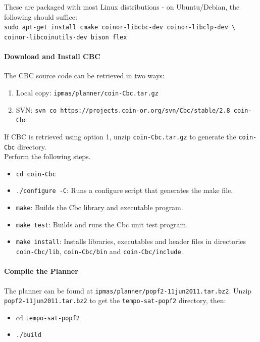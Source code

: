 These are packaged with most Linux distributions - on Ubuntu/Debian, the following should suffice:\\

\texttt{sudo apt-get install cmake coinor-libcbc-dev coinor-libclp-dev \textbackslash \\coinor-libcoinutils-dev bison flex}

\paragraph{Download and Install CBC}
The CBC source code can be retrieved in two ways:

\begin{enumerate}
\item Local copy: \texttt{ipmas/planner/coin-Cbc.tar.gz}
\item SVN: \footnotesize{\texttt{svn co https://projects.coin-or.org/svn/Cbc/stable/2.8 coin-Cbc}}
\end{enumerate}

If CBC is retrieved using option 1, unzip \texttt{coin-Cbc.tar.gz} to generate the \texttt{coin-Cbc} directory.\\ 

Perform the following steps.
\begin{itemize}
\item \texttt{cd coin-Cbc}
\item \texttt{./configure -C}: Runs a configure script that generates the make file.
\item \texttt{make}: Builds the Cbc library and executable program.
\item \texttt{make test}: Builds and runs the Cbc unit test program.
\item \texttt{make install}: Installs libraries, executables and header files in directories \texttt{coin-Cbc/lib}, \texttt{coin-Cbc/bin} and \texttt{coin-Cbc/include}.
\end{itemize}

\paragraph{Compile the Planner}
The planner can be found at \texttt{ipmas/planner/popf2-11jun2011.tar.bz2}. Unzip \texttt{popf2-11jun2011.tar.bz2} to get the \texttt{tempo-sat-popf2} directory, then:
\begin{itemize}
\item cd \texttt{tempo-sat-popf2}
\item \texttt{./build}
\end{itemize}


